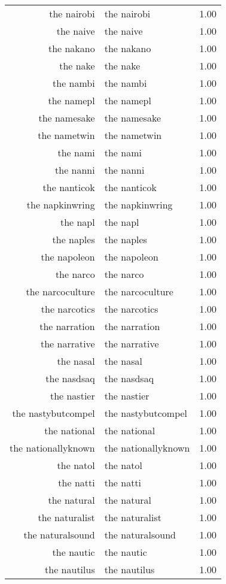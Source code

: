 \begin{table}[ht]
\begin{tabular}{rlr}
  the nairobi & the nairobi & 1.00 \\ 
  the naive & the naive & 1.00 \\ 
  the nakano & the nakano & 1.00 \\ 
  the nake & the nake & 1.00 \\ 
  the nambi & the nambi & 1.00 \\ 
  the namepl & the namepl & 1.00 \\ 
  the namesake & the namesake & 1.00 \\ 
  the nametwin & the nametwin & 1.00 \\ 
  the nami & the nami & 1.00 \\ 
  the nanni & the nanni & 1.00 \\ 
  the nanticok & the nanticok & 1.00 \\ 
  the napkinwring & the napkinwring & 1.00 \\ 
  the napl & the napl & 1.00 \\ 
  the naples & the naples & 1.00 \\ 
  the napoleon & the napoleon & 1.00 \\ 
  the narco & the narco & 1.00 \\ 
  the narcoculture & the narcoculture & 1.00 \\ 
  the narcotics & the narcotics & 1.00 \\ 
  the narration & the narration & 1.00 \\ 
  the narrative & the narrative & 1.00 \\ 
  the nasal & the nasal & 1.00 \\ 
  the nasdsaq & the nasdsaq & 1.00 \\ 
  the nastier & the nastier & 1.00 \\ 
  the nastybutcompel & the nastybutcompel & 1.00 \\ 
  the national & the national & 1.00 \\ 
  the nationallyknown & the nationallyknown & 1.00 \\ 
  the natol & the natol & 1.00 \\ 
  the natti & the natti & 1.00 \\ 
  the natural & the natural & 1.00 \\ 
  the naturalist & the naturalist & 1.00 \\ 
  the naturalsound & the naturalsound & 1.00 \\ 
  the nautic & the nautic & 1.00 \\ 
  the nautilus & the nautilus & 1.00 \\ 

\end{tabular}
\end{table}
